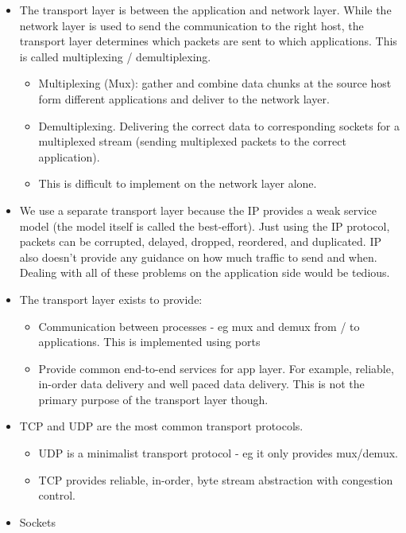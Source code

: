 \begin{itemize}
\tightlist
\item
  The transport layer is between the application and network layer.
  While the network layer is used to send the communication to the right
  host, the transport layer determines which packets are sent to which
  applications. This is called multiplexing / demultiplexing.

  \begin{itemize}
  \tightlist
  \item
    Multiplexing (Mux): gather and combine data chunks at the source
    host form different applications and deliver to the network layer.
  \item
    Demultiplexing. Delivering the correct data to corresponding sockets
    for a multiplexed stream (sending multiplexed packets to the correct
    application).
  \item
    This is difficult to implement on the network layer alone.
  \end{itemize}
\item
  We use a separate transport layer because the IP provides a weak
  service model (the model itself is called the best-effort). Just using
  the IP protocol, packets can be corrupted, delayed, dropped,
  reordered, and duplicated. IP also doesn't provide any guidance on how
  much traffic to send and when. Dealing with all of these problems on
  the application side would be tedious.
\item
  The transport layer exists to provide:

  \begin{itemize}
  \tightlist
  \item
    Communication between processes - eg mux and demux from / to
    applications. This is implemented using ports
  \item
    Provide common end-to-end services for app layer. For example,
    reliable, in-order data delivery and well paced data delivery. This
    is not the primary purpose of the transport layer though.
  \end{itemize}
\item
  TCP and UDP are the most common transport protocols.

  \begin{itemize}
  \tightlist
  \item
    UDP is a minimalist transport protocol - eg it only provides
    mux/demux.
  \item
    TCP provides reliable, in-order, byte stream abstraction with
    congestion control.
  \end{itemize}
\item
  Sockets


\end{itemize}
